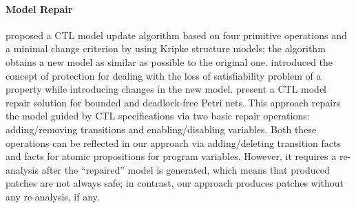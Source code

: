 



\vspace{-1mm}
\noindent\paragraph{\textbf{Model Repair}}




\citet{DBLP:conf/ecai/DingZ06} proposed a CTL model update algorithm based on four primitive operations and a minimal change criterion by using Kripke structure models; the algorithm obtains a new model as similar as possible to the original one. 
\citet{DBLP:journals/ai/CarrilloR14} introduced the concept of protection for dealing with the loss of satisfiability problem of a property while introducing changes in the new model. 
\citet{martinez2015ctl} present a CTL model repair solution for bounded and deadlock-free Petri nets. 
This approach repairs the model guided by CTL specifications via two basic repair operations: adding/removing transitions and enabling/disabling variables. Both these operations can be reflected in our approach via adding/deleting transition facts and facts for atomic propositions for program variables. 
However, it requires a re-analysis after the ``repaired'' model is generated, which means that produced patches are not always safe; 
in contrast, our approach produces patches without any re-analysis, if any. 

